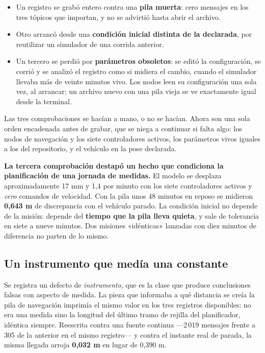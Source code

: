\documentclass[12pt,letterpaper]{article}
\begin{document}
\begin{itemize}
    \item Un registro se grabó entero contra una \textbf{pila muerta}: cero mensajes en los tres tópicos que importan, y no se advirtió hasta abrir el archivo.
    \item Otro arrancó desde una \textbf{condición inicial distinta de la declarada}, por reutilizar un simulador de una corrida anterior.
    \item Un tercero se perdió por \textbf{parámetros obsoletos}: se editó la configuración, se corrió y se analizó el registro como si midiera el cambio, cuando el simulador llevaba más de veinte minutos vivo. Los nodos leen su configuración una sola vez, al arrancar; un archivo nuevo con una pila vieja se ve exactamente igual desde la terminal.
\end{itemize}

Las tres comprobaciones se hacían a mano, o no se hacían. Ahora son una sola orden encadenada antes de grabar, que se niega a continuar si falta algo: los nodos de navegación y los siete controladores activos, los parámetros vivos iguales a los del repositorio, y el vehículo en la pose declarada.

\textbf{La tercera comprobación destapó un hecho que condiciona la planificación de una jornada de medidas.} El modelo se desplaza aproximadamente 17 mm y 1,4\textdegree{} por minuto con los siete controladores activos y \emph{cero} comandos de velocidad. Con la pila unos 48 minutos en reposo se midieron \textbf{0,643 m} de discrepancia con el vehículo parado. La condición inicial no depende de la misión: depende del \textbf{tiempo que la pila lleva quieta}, y sale de tolerancia en siete a nueve minutos. Dos misiones «idénticas» lanzadas con diez minutos de diferencia no parten de lo mismo.

\subsection{Un instrumento que medía una constante}

Se registra un defecto de \emph{instrumento}, que es la clase que produce conclusiones falsas con aspecto de medida. La pieza que informaba a qué distancia se creía la pila de navegación imprimía el mismo valor en los tres registros disponibles: no era una medida sino la longitud del último tramo de rejilla del planificador, idéntica siempre. Reescrita contra una fuente continua ---2\,019 mensajes frente a 305 de la anterior en el mismo registro--- y contra el instante real de parada, la misma llegada arroja \textbf{0,032 m} en lugar de 0,390 m.
\end{document}
